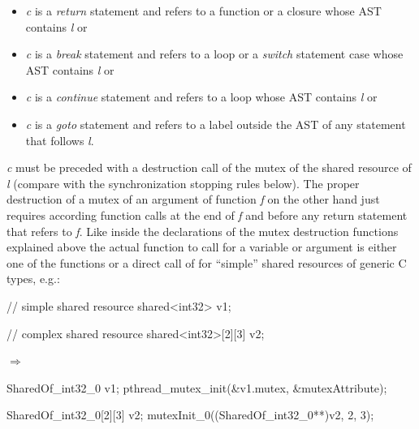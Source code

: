 \begin{itemize}
\item \textit{c} is a \textit{return} statement and refers to a function or a closure whose AST contains \textit{l} or
\item \textit{c} is a \textit{break} statement and refers to a loop or a \textit{switch} statement case whose AST contains \textit{l} or
\item \textit{c} is a \textit{continue} statement and refers to a loop whose AST contains \textit{l} or
\item \textit{c} is a \textit{goto} statement and refers to a label outside the AST of any statement that follows \textit{l}.
\end{itemize}
\textit{c} must be preceded with a destruction call of the mutex of the shared resource of \textit{l} (compare with the synchronization stopping rules below). The proper destruction of a mutex of an argument of function \textit{f} on the other hand just requires according function calls at the end of \textit{f} and before any return statement that refers to \textit{f}. 
Like inside the declarations of the mutex destruction functions explained above  the actual function to call for a variable or argument is either one of the  functions or a direct call of  for ``simple'' shared resources of generic C types, e.g.:
\begin{center}
\begin{minipage}{0.3\textwidth}
\begin{ccode}
// simple shared resource
shared<int32> v1;

// complex shared resource
shared<int32>[2][3] v2;
\end{ccode}
\end{minipage}
\qquad$\Longrightarrow$\qquad\qquad
\begin{minipage}{0.4\textwidth}
\begin{ccode}
SharedOf_int32_0 v1;
pthread_mutex_init(&v1.mutex, &mutexAttribute);

SharedOf_int32_0[2][3] v2;
mutexInit_0((SharedOf_int32_0**)v2, 2, 3);
\end{ccode}
\end{minipage}
\end{center}

